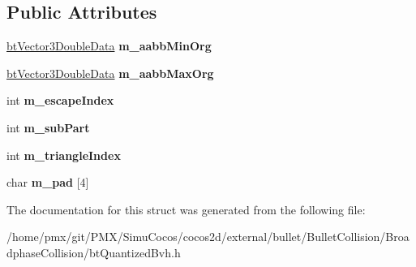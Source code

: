 \subsection*{Public Attributes}
\begin{DoxyCompactItemize}
\item 
\mbox{\label{structbtOptimizedBvhNodeDoubleData_ad80b6c98ad8bc8eb09343a9323fbb574}} 
\hyperlink{structbtVector3DoubleData}{bt\+Vector3\+Double\+Data} {\bfseries m\+\_\+aabb\+Min\+Org}
\item 
\mbox{\label{structbtOptimizedBvhNodeDoubleData_ac4af6af6c427e2cf8f1bbe59d2675f4e}} 
\hyperlink{structbtVector3DoubleData}{bt\+Vector3\+Double\+Data} {\bfseries m\+\_\+aabb\+Max\+Org}
\item 
\mbox{\label{structbtOptimizedBvhNodeDoubleData_a2908fce871eac515aad788bd9981a295}} 
int {\bfseries m\+\_\+escape\+Index}
\item 
\mbox{\label{structbtOptimizedBvhNodeDoubleData_ae113561e2ba8017196dcfe9a86bc3b56}} 
int {\bfseries m\+\_\+sub\+Part}
\item 
\mbox{\label{structbtOptimizedBvhNodeDoubleData_ad515ab97c3b3bac7c048bc29d690ccce}} 
int {\bfseries m\+\_\+triangle\+Index}
\item 
\mbox{\label{structbtOptimizedBvhNodeDoubleData_a1b3629b3c1780759e9d443d70a55ade2}} 
char {\bfseries m\+\_\+pad} \mbox{[}4\mbox{]}
\end{DoxyCompactItemize}


The documentation for this struct was generated from the following file\+:\begin{DoxyCompactItemize}
\item 
/home/pmx/git/\+P\+M\+X/\+Simu\+Cocos/cocos2d/external/bullet/\+Bullet\+Collision/\+Broadphase\+Collision/bt\+Quantized\+Bvh.\+h\end{DoxyCompactItemize}
